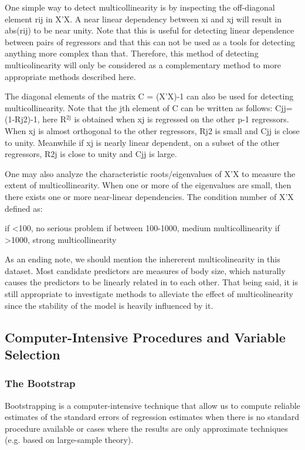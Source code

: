 \documentclass[11pt]{article}
\begin{document}
One simple way to detect multicollinearity is by inspecting the off-diagonal element rij in X’X. A near
linear dependency between xi and xj will result in abs(rij) to be near unity. Note that this is useful for
detecting linear dependence between pairs of regressors and that this can not be used as a tools for
detecting anything more complex than that. Therefore, this method of detecting multicolinearity will
only be considered as a complementary method to more appropriate methods described here.

The diagonal elements of the matrix C = (X’X)-1 can also be used for detecting multicollinearity. Note that 
the jth element of C can be written as follows: Cjj=(1-Rj2)-1, 
here R\(^{\text{2j}}\) is obtained when xj is regressed on the other p-1 regressors.
When xj is almost orthogonal to the other regressors, Rj2 is small and Cjj is close to unity. Meanwhile 
if xj is nearly linear dependent, on a subset of the other regressors, R2j is close to unity and Cjj is large.

One may also analyze the characteristic roots/eigenvalues of X’X to measure the extent of multicollinearity. 
When one or more of the eigenvalues are small, then there exists one or more near-linear dependencies. 
The condition number of X’X defined as:

if <100, no serious problem
if between 100-1000, medium multicollinearity
if >1000, strong multicollinearity

As an ending note, we should mention the inhererent multicolinearity in this dataset. Most candidate predictors 
are measures of body size, which naturally causes the predictors to be linearly related in to each other. That 
being said, it is still appropriate to investigate methods to alleviate the effect of multicolinearity since 
the stability of the model is heavily influenced by it. 

\subsection{Computer-Intensive Procedures and Variable Selection}
\label{sec:orgb866434}

\subsubsection{The Bootstrap}
\label{sec:orgcffca56}

Bootstrapping is a computer-intensive technique that allow us to compute reliable estimates of the standard
errors of regression estimates when there is no standard procedure available or cases where the results are
only approximate techniques (e.g. based on large-sample theory). 
\end{document}

